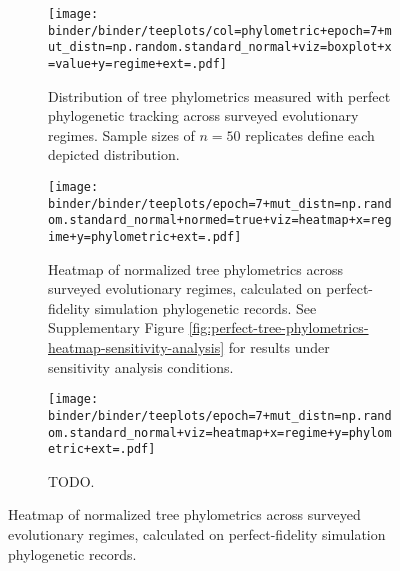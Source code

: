 \begin{figure*}
  \centering
  \begin{subfigure}[b]{\textwidth}
    \texttt{[image: binder/binder/teeplots/col=phylometric+epoch=7+mut\_distn=np.random.standard\_normal+viz=boxplot+x=value+y=regime+ext=.pdf]}
  \caption{%
    Distribution of tree phylometrics measured with perfect phylogenetic tracking across surveyed evolutionary regimes.
    Sample sizes of $n=50$ replicates define each depicted distribution.
  }
  \label{fig:perfect-tree-phylometrics}
  \end{subfigure}
  \vspace{1cm}
  \begin{subfigure}[b]{\textwidth}
  \texttt{[image: binder/binder/teeplots/epoch=7+mut\_distn=np.random.standard\_normal+normed=true+viz=heatmap+x=regime+y=phylometric+ext=.pdf]}
  \caption{%
    Heatmap of normalized tree phylometrics across surveyed evolutionary regimes, calculated on perfect-fidelity simulation phylogenetic records.
    See Supplementary Figure \ref{fig:perfect-tree-phylometrics-heatmap-sensitivity-analysis} for results under sensitivity analysis conditions.
  }
  \label{fig:perfect-tree-phylometrics-heatmap}
  \end{subfigure}
  \vspace{1cm}
  \begin{subfigure}[b]{\textwidth}
    \texttt{[image: binder/binder/teeplots/epoch=7+mut\_distn=np.random.standard\_normal+viz=heatmap+x=regime+y=phylometric+ext=.pdf]}
    \caption{TODO.}
  \end{subfigure}%
  \caption{Heatmap of normalized tree phylometrics across surveyed evolutionary regimes, calculated on perfect-fidelity simulation phylogenetic records.}
  \label{fig:perfect-tree-phylometrics-compound}
\end{figure*}

